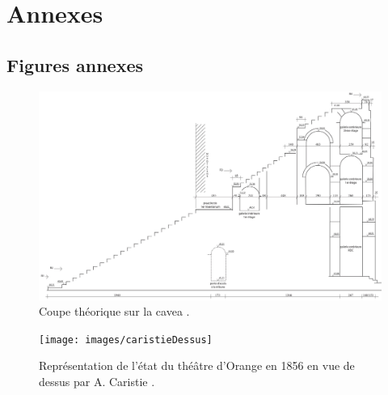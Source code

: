 \chapter{Annexes}



\section{Figures annexes}

\begin{figure}[!h]
	\includegraphics[width=\linewidth]{images/CoupeCavea}
	\caption[Coupe théorique sur la \gls{cavea}.]{Coupe théorique sur la \gls{cavea} \cite[Pl. LX]{orangePl}.} 
	\label{coupeCavea} 
\end{figure} 

\begin{figure}[!h]
	\texttt{[image: images/caristieDessus]}
	\caption[Vue de dessus par A. Caristie 1856.]{Représentation de l'état du théâtre d'Orange en 1856 en vue de dessus par A. Caristie \cite[Pl. I]{orangePl}.} 
	\label{caristieDessus} 
\end{figure} 
	
